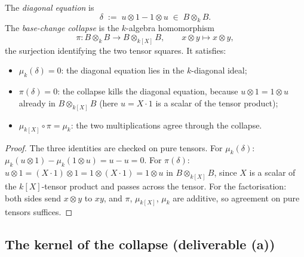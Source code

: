 \begin{definition}
  \label{def:diagonalSetup}
  \leanok
  The \emph{diagonal equation} is
  \[
    \delta \;:=\; u \otimes 1 - 1 \otimes u \;\in\; B \otimes_k B .
  \]
  The \emph{base-change collapse} is the \(k\)-algebra homomorphism
  \[
    \pi \colon B \otimes_k B \longrightarrow B \otimes_{k[X]} B, \qquad x \otimes y \mapsto x
    \otimes y,
  \]
  the surjection identifying the two tensor squares. It satisfies:
  \begin{itemize}
    \item \(\mu_k(\delta) = 0\): the diagonal equation lies in the \(k\)-diagonal ideal;
    \item \(\pi(\delta) = 0\): the collapse kills the diagonal equation, because \(u \otimes 1 =
      1 \otimes u\) already in \(B \otimes_{k[X]} B\) (here \(u = X \cdot 1\) is a scalar of the
      tensor product);
    \item \(\mu_{k[X]} \circ \pi = \mu_k\): the two multiplications agree through the collapse.
  \end{itemize}
\end{definition}
\begin{proof}
  \leanok
  The three identities are checked on pure tensors. For \(\mu_k(\delta)\): \(\mu_k(u \otimes 1) -
  \mu_k(1 \otimes u) = u - u = 0\). For \(\pi(\delta)\): \(u \otimes 1 = (X \cdot 1) \otimes 1 = 1
  \otimes (X \cdot 1) = 1 \otimes u\) in \(B \otimes_{k[X]} B\), since \(X\) is a scalar of the
  \(k[X]\)-tensor product and passes across the tensor. For the factorisation: both sides send
  \(x \otimes y\) to \(xy\), and \(\pi\), \(\mu_{k[X]}\), \(\mu_k\) are additive, so agreement on
  pure tensors suffices.
\end{proof}

\subsection{The kernel of the collapse (deliverable (a))}

